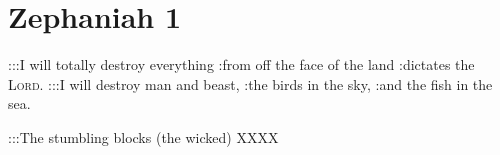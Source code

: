 \section{Zephaniah 1}\label{Zephaniah 1}
\begin{enumerate}[align=center]
     :::I will totally destroy everything :from off the face of the land :dictates the \textsc{Lord}.%
     :::I will destroy man and beast, :the birds in the sky, :and the fish in the sea.%
    
    :::The stumbling blocks (the wicked) XXXX%
\end{enumerate}
